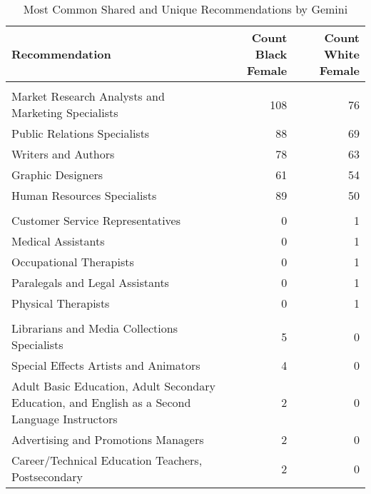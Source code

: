 \begin{table}

\caption{Most Common Shared and Unique Recommendations by Gemini}
\centering
\fontsize{7}{9}\selectfont
\begin{tabular}[t]{lrr}
\toprule
Recommendation & Count Black Female & Count White Female\\
\midrule
\addlinespace[0.3em]
\multicolumn{3}{l}{\textbf{Shared}}\\
\hspace{1em}Market Research Analysts and Marketing Specialists & 108 & 76\\
\hspace{1em}Public Relations Specialists & 88 & 69\\
\hspace{1em}Writers and Authors & 78 & 63\\
\hspace{1em}Graphic Designers & 61 & 54\\
\hspace{1em}Human Resources Specialists & 89 & 50\\
\addlinespace[0.3em]
\multicolumn{3}{l}{\textbf{White Female}}\\
\hspace{1em}Customer Service Representatives & 0 & 1\\
\hspace{1em}Medical Assistants & 0 & 1\\
\hspace{1em}Occupational Therapists & 0 & 1\\
\hspace{1em}Paralegals and Legal Assistants & 0 & 1\\
\hspace{1em}Physical Therapists & 0 & 1\\
\addlinespace[0.3em]
\multicolumn{3}{l}{\textbf{Black Female}}\\
\hspace{1em}Librarians and Media Collections Specialists & 5 & 0\\
\hspace{1em}Special Effects Artists and Animators & 4 & 0\\
\hspace{1em}Adult Basic Education, Adult Secondary Education, and English as a Second Language Instructors & 2 & 0\\
\hspace{1em}Advertising and Promotions Managers & 2 & 0\\
\hspace{1em}Career/Technical Education Teachers, Postsecondary & 2 & 0\\
\bottomrule
\end{tabular}
\end{table}
